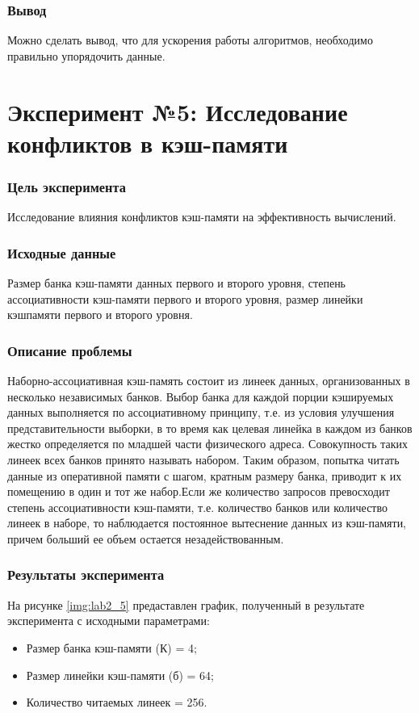 \subsection*{Вывод}
Можно сделать вывод, что для ускорения работы алгоритмов, необходимо правильно упорядочить данные.


\chapter*{Эксперимент №5: Исследование конфликтов в кэш-памяти}

\subsection*{Цель эксперимента}
Исследование влияния конфликтов кэш-памяти на эффективность вычислений.


\subsection*{Исходные данные}
Размер банка кэш-памяти данных первого и второго уровня, степень ассоциативности кэш-памяти первого и второго уровня, размер линейки кэшпамяти первого и второго уровня.

\subsection*{Описание проблемы}
Наборно-ассоциативная кэш-память состоит из линеек данных, организованных в несколько независимых банков. Выбор банка для каждой порции кэшируемых данных выполняется по ассоциативному принципу, т.е. из условия улучшения представительности выборки, в то время как целевая линейка в каждом из банков жестко определяется по младшей части физического адреса. Совокупность таких линеек всех банков принято называть набором. Таким образом, попытка читать данные из оперативной памяти с шагом, кратным размеру банка, приводит к их помещению в один и тот же набор.Если же количество запросов превосходит степень ассоциативности кэш-памяти, т.е. количество банков или количество линеек в наборе, то наблюдается постоянное вытеснение данных из кэш-памяти, причем больший ее объем остается незадействованным. 

\subsection*{Результаты эксперимента}
На рисунке \ref{img:lab2_5} предаставлен график, полученный в результате эксперимента с исходными параметрами:
\begin{itemize}
	\item Размер банка кэш-памяти (К) = 4;
	\item Размер линейки кэш-памяти (б) = 64;
	\item Количество читаемых линеек = 256.
\end{itemize}

